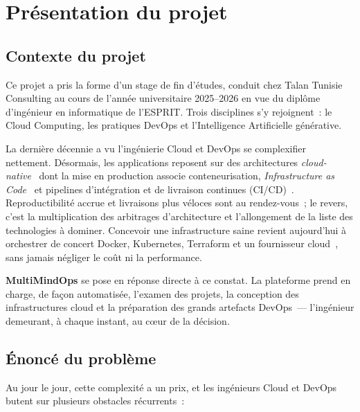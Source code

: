 \section{Présentation du projet}

\subsection{Contexte du projet}
Ce projet a pris la forme d'un stage de fin d'études, conduit chez Talan Tunisie Consulting
au cours de l'année universitaire 2025--2026 en vue du diplôme d'ingénieur en informatique de
l'ESPRIT. Trois disciplines s'y rejoignent~: le Cloud Computing, les pratiques DevOps et
l'Intelligence Artificielle générative.

La dernière décennie a vu l'ingénierie Cloud et DevOps se complexifier nettement. Désormais,
les applications reposent sur des architectures \textit{cloud-native}~\cite{CNCF} dont la
mise en production associe conteneurisation, \textit{Infrastructure as Code}~\cite{IAC_MORRIS}
et pipelines d'intégration et de livraison continues (CI/CD)~\cite{DEVOPS_HANDBOOK}.
Reproductibilité accrue et livraisons plus véloces sont au rendez-vous~; le revers, c'est la
multiplication des arbitrages d'architecture et l'allongement de la liste des technologies à
dominer. Concevoir une infrastructure saine revient aujourd'hui à orchestrer de concert
Docker, Kubernetes, Terraform et un fournisseur cloud~\cite{NIST_CLOUD}, sans jamais négliger
le coût ni la performance.

\textbf{MultiMindOps} se pose en réponse directe à ce constat. La plateforme prend en charge,
de façon automatisée, l'examen des projets, la conception des infrastructures cloud et la
préparation des grands artefacts DevOps~--- l'ingénieur demeurant, à chaque instant, au cœur
de la décision.

\subsection{Énoncé du problème}
Au jour le jour, cette complexité a un prix, et les ingénieurs Cloud et DevOps butent sur
plusieurs obstacles récurrents~:

